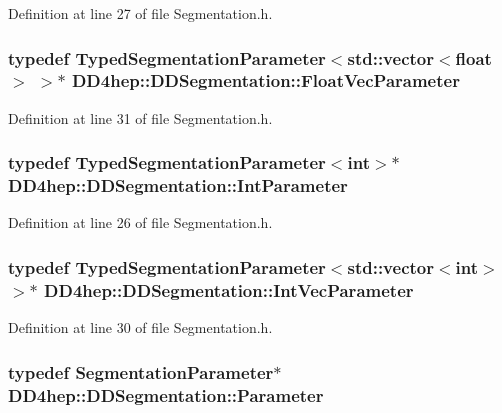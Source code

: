 Definition at line 27 of file Segmentation.h.\hypertarget{namespace_d_d4hep_1_1_d_d_segmentation_ab7445ed6131fb76c39c0c2463062d95e}{
\subsubsection[{FloatVecParameter}]{\setlength{\rightskip}{0pt plus 5cm}typedef {\bf TypedSegmentationParameter}$<$std::vector$<$float$>$ $>$$\ast$ {\bf DD4hep::DDSegmentation::FloatVecParameter}}}
\label{namespace_d_d4hep_1_1_d_d_segmentation_ab7445ed6131fb76c39c0c2463062d95e}


Definition at line 31 of file Segmentation.h.\hypertarget{namespace_d_d4hep_1_1_d_d_segmentation_a40b9037137fce6e98a4a1b3e74078679}{
\subsubsection[{IntParameter}]{\setlength{\rightskip}{0pt plus 5cm}typedef {\bf TypedSegmentationParameter}$<$int$>$$\ast$ {\bf DD4hep::DDSegmentation::IntParameter}}}
\label{namespace_d_d4hep_1_1_d_d_segmentation_a40b9037137fce6e98a4a1b3e74078679}


Definition at line 26 of file Segmentation.h.\hypertarget{namespace_d_d4hep_1_1_d_d_segmentation_a999961b3c725feedb2456dd0f046f1e3}{
\subsubsection[{IntVecParameter}]{\setlength{\rightskip}{0pt plus 5cm}typedef {\bf TypedSegmentationParameter}$<$std::vector$<$int$>$ $>$$\ast$ {\bf DD4hep::DDSegmentation::IntVecParameter}}}
\label{namespace_d_d4hep_1_1_d_d_segmentation_a999961b3c725feedb2456dd0f046f1e3}


Definition at line 30 of file Segmentation.h.\hypertarget{namespace_d_d4hep_1_1_d_d_segmentation_af6c6bad2a745d807a0ed00506fb34ccf}{
\subsubsection[{Parameter}]{\setlength{\rightskip}{0pt plus 5cm}typedef {\bf SegmentationParameter}$\ast$ {\bf DD4hep::DDSegmentation::Parameter}}}
\label{namespace_d_d4hep_1_1_d_d_segmentation_af6c6bad2a745d807a0ed00506fb34ccf}


